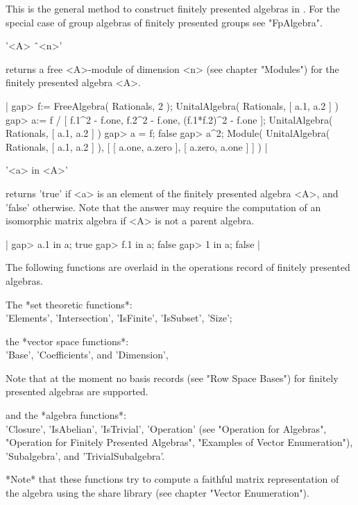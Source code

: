 This is the general method to construct finitely presented algebras in
{\GAP}.  For the special case of group algebras of finitely presented groups
see "FpAlgebra".

\vspace{5mm}

'<A> \^\ <n>'

returns a free <A>-module of dimension <n> (see chapter "Modules") for the
finitely presented algebra <A>.

|    gap> f:= FreeAlgebra( Rationals, 2 );
    UnitalAlgebra( Rationals, [ a.1, a.2 ] )
    gap> a:= f / [ f.1^2 - f.one, f.2^2 - f.one, (f.1*f.2)^2 - f.one ];
    UnitalAlgebra( Rationals, [ a.1, a.2 ] )
    gap> a = f;
    false
    gap> a^2;
    Module( UnitalAlgebra( Rationals, [ a.1, a.2 ] ), 
    [ [ a.one, a.zero ], [ a.zero, a.one ] ] ) |

\vspace{5mm}

'<a> in <A>'

returns 'true' if <a> is an element of the finitely presented algebra <A>,
and 'false' otherwise.  Note that the answer may require the computation of
an isomorphic matrix algebra if <A> is not a parent algebra.

|    gap> a.1 in a;
    true
    gap> f.1 in a;
    false
    gap> 1 in a;
    false |


The following functions are overlaid in the operations record of finitely
presented algebras.

The *set theoretic functions*: \\
    'Elements', 'Intersection', 'IsFinite', 'IsSubset', 'Size';

the *vector space functions*: \\
    'Base', 'Coefficients', and 'Dimension',

Note that at the moment no basis records (see "Row Space Bases") for finitely
presented algebras are supported.

and the *algebra functions*: \\
    'Closure', 'IsAbelian', 'IsTrivial', 'Operation' (see "Operation for
    Algebras", "Operation for Finitely Presented Algebras", "Examples of
    Vector Enumeration"), 'Subalgebra', and 'TrivialSubalgebra'.

*Note* that these functions try to compute a faithful matrix representation
of the algebra using the {\VE} share library (see chapter "Vector
Enumeration").

